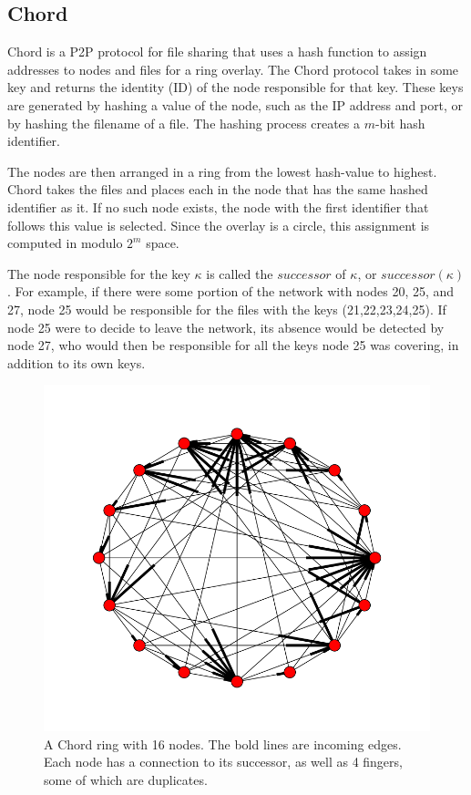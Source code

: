 \subsection{Chord}
Chord \cite{chord} is a P2P protocol for file sharing that uses a hash function to assign addresses to nodes and files for a ring overlay. The Chord protocol takes in some key and returns the identity (ID) of the node responsible for that key.  These keys are generated by hashing a value of the node, such as the IP address and port, or by hashing the filename of a file.  The hashing process creates a $m$-bit hash identifier.

The nodes are then arranged in a ring from the lowest hash-value to highest.  Chord takes the files and places each in the node that has the same hashed identifier as it.  If no such node exists, the node with the first identifier that follows this value is selected. Since the overlay is a circle, this assignment is computed in modulo $2^m$ space.  

The node responsible for the key $\kappa$ is called the $successor$ of $\kappa$, or $successor(\kappa)$.  For example, if there were some portion of the network with nodes 20, 25, and 27, node 25 would be responsible for the files with the keys (21,22,23,24,25). If node 25 were to decide to leave the network, its absence would be detected by node 27, who would then be responsible for all the keys node 25 was covering, in addition to its own keys. 
\begin{figure}
	\includegraphics[width=\linewidth]{figs/chordreal}
	\caption{A Chord ring with 16 nodes.  The bold lines are incoming edges.  Each node has a connection to its successor, as well as 4 fingers, some of which are duplicates.}
	\label{fig:chordreal}
\end{figure}


